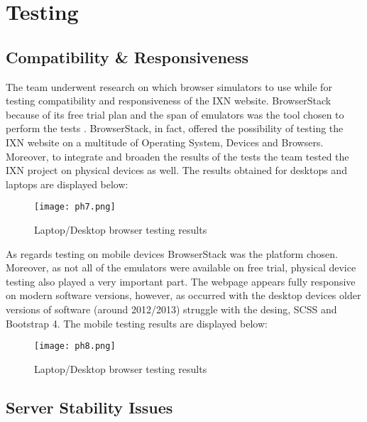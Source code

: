 \documentclass[fontsize=10pt]{extarticle}
\numberwithin{figure}{section} %
\begin{document}
\hypertarget{testing}{%
\section{Testing}\label{testing}}

\hypertarget{compatibility-responsiveness}{%
\subsection{Compatibility \&
Responsiveness}\label{compatibility-responsiveness}}

The team underwent research on which browser simulators to use while for
testing compatibility and responsiveness of the IXN website.
BrowserStack because of its free trial plan and the span of emulators
was the tool chosen to perform the tests \cite{g6}. BrowserStack, in
fact, offered the possibility of testing the IXN website on a multitude
of Operating System, Devices and Browsers. Moreover, to integrate and
broaden the results of the tests the team tested the IXN project on
physical devices as well. The results obtained for desktops and laptops
are displayed below:

\begin{figure}[H]
      \centering
      \texttt{[image: ph7.png]}
      \caption{Laptop/Desktop browser testing results}
 \end{figure}

As regards testing on mobile devices BrowserStack was the platform
chosen. Moreover, as not all of the emulators were available on free
trial, physical device testing also played a very important part. The
webpage appears fully responsive on modern software versions, however,
as occurred with the desktop devices older versions of software (around
2012/2013) struggle with the desing, SCSS and Bootstrap 4. The mobile
testing results are displayed below:

\begin{figure}[H]
      \centering
      \texttt{[image: ph8.png]}
      \caption{Laptop/Desktop browser testing results}
 \end{figure}

\hypertarget{server-stability-issues}{%
\subsection{Server Stability Issues}\label{server-stability-issues}}
\end{document}
